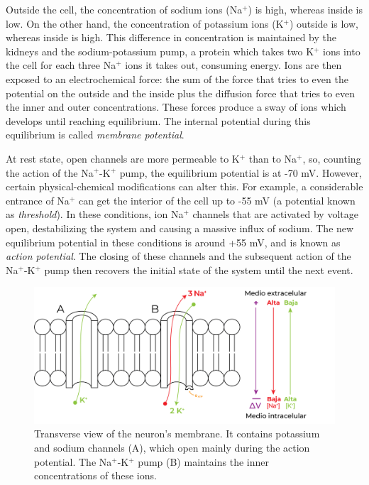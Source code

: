 Outside the cell, the concentration of sodium ions (Na$^+$) is high, whereas inside is low. On the other hand, the concentration of potassium ions (K$^+$) outside is low, whereas inside is high. This difference in concentration is maintained by the kidneys and the sodium-potassium pump, a protein which takes two K$^+$ ions into the cell for each three Na$^+$ ions it takes out, consuming energy. Ions are then exposed to an electrochemical force: the sum of the force that tries to even the potential on the outside and the inside plus the diffusion force that tries to even the inner and outer concentrations. These forces produce a sway of ions which develops until reaching equilibrium. The internal potential during this equilibrium is called \textit{membrane potential}.

At rest state, open channels are more permeable to K$^+$ than to Na$^+$, so, counting the action of the Na$^+$-K$^+$ pump, the equilibrium potential is at -70 mV. However, certain physical-chemical modifications can alter this. For example, a considerable entrance of Na$^+$ can get the interior of the cell up to -55 mV (a potential known as \textit{threshold}). In these conditions, ion Na$^+$ channels that are activated by voltage open, destabilizing the system and causing a massive influx of sodium. The new equilibrium potential in these conditions is around +55 mV, and is known as \textit{action potential}. The closing of these channels and the subsequent action of the Na$^+$-K$^+$ pump then recovers the initial state of the system until the next event.

\begin{figure}[H]
	\centering
	\includegraphics[width=\linewidth]{media/6-potencial.png}
	\caption{Transverse view of the neuron's membrane. It contains potassium and sodium channels (A), which open mainly during the action potential. The Na$^+$-K$^+$ pump (B) maintains the inner concentrations of these ions.}
	\label{action}
\end{figure}

